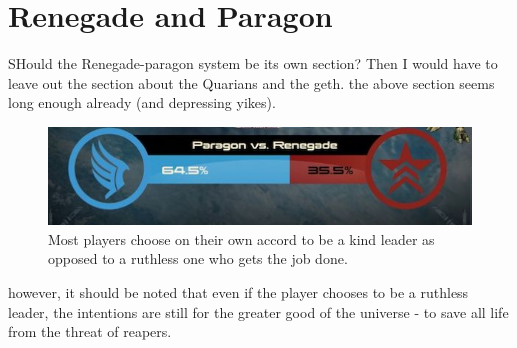 \documentclass[journal]{IEEEtran}
\begin{document}
\section{Renegade and Paragon}
SHould the Renegade-paragon system be its own section?
Then I would have to leave out the section about the Quarians and the geth.
the above section seems long enough already (and depressing yikes).
%
%
%

\begin{figure}[h!]
 \includegraphics[width=.5\textwidth]{paragon}
 \caption{Most players choose on their own accord to be a kind leader as opposed to a ruthless one who gets the job done. \cite{ea}}
\end{figure}
however, it should be noted that even if the player chooses to be a ruthless leader, the intentions are still for the greater good of the universe - to save
all life from the threat of reapers.
\end{document}
